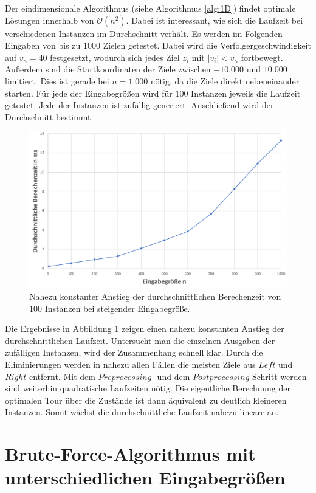 \documentclass[german,version-2019-11]{uzl-thesis}
\begin{document}
Der eindimensionale Algorithmus (siehe Algorithmus \ref{alg:1D}) findet optimale Lösungen innerhalb von $\mathcal{O}(n^2)$. Dabei ist interessant, wie sich die Laufzeit bei verschiedenen Instanzen im Durchschnitt verhält. Es werden im Folgenden Eingaben von bis zu $1000$ Zielen getestet. Dabei wird die Verfolgergeschwindigkeit auf $v_\kappa=40$ festgesetzt, wodurch sich jedes Ziel $z_i$ mit $|v_i|<v_\kappa$ fortbewegt. Außerdem sind die Startkoordinaten der Ziele zwischen $-10.000$ und $10.000$ limitiert. Dies ist gerade bei $n=1.000$ nötig, da die Ziele direkt nebeneinander starten. Für jede der Eingabegrößen wird für $100$ Instanzen jeweils die Laufzeit getestet. Jede der Instanzen ist zufällig generiert. Anschließend wird der Durchschnitt bestimmt. \\
\begin{figure}[htpb]
\centering
\includegraphics[scale=0.24]{../Grafiken/Verwendete/Exp1D_2.png}
\caption{Nahezu konstanter Anstieg der durchschnittlichen Berechenzeit von $100$ Instanzen bei steigender Eingabegröße.}
\label{fig:Exp1D}
\end{figure} 
Die Ergebnisse in Abbildung \ref{fig:Exp1D} zeigen einen nahezu konstanten Anstieg der durchschnittlichen Laufzeit. Untersucht man die einzelnen Ausgaben der zufälligen Instanzen, wird der Zusammenhang schnell klar. Durch die Eliminierungen werden in nahezu allen Fällen die meisten Ziele aus $Left$ und $Right$ entfernt. Mit dem $Preprocessing$- und dem $Postprocessing$-Schritt werden sind weiterhin quadratische Laufzeiten nötig. Die eigentliche Berechnung der optimalen Tour über die Zustände ist dann äquivalent zu deutlich kleineren Instanzen. Somit wächst die durchschnittliche Laufzeit nahezu lineare an. 

\section{Brute-Force-Algorithmus mit unterschiedlichen Eingabegrößen}
\end{document}
